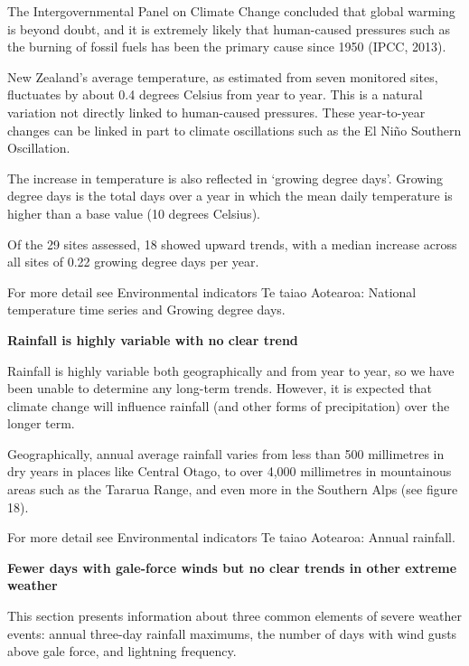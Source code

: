 \documentclass[11pt]{article} %
\begin{document}
The Intergovernmental Panel on Climate Change concluded that global warming is beyond doubt, and it is extremely likely that human-caused pressures such as the burning of fossil fuels has been the primary cause since 1950 (IPCC, 2013).


New Zealand’s average temperature, as estimated from seven monitored sites, fluctuates by about 0.4 degrees Celsius from year to year. This is a natural variation not directly linked to human-caused pressures. These year-to-year changes can be linked in part to climate oscillations such as the El Niño Southern Oscillation.

The increase in temperature is also reflected in ‘growing degree days’. Growing degree days is the total days over a year in which the mean daily temperature is higher than a base value (10 degrees Celsius).

Of the 29 sites assessed, 18 showed upward trends, with a median increase across all sites of 0.22 growing degree days per year.

For more detail see Environmental indicators Te taiao Aotearoa: National temperature time series and Growing degree days.

\textbf{Rainfall is highly variable with no clear trend}

Rainfall is highly variable both geographically and from year to year, so we have been unable to determine any long-term trends. However, it is expected that climate change will influence rainfall (and other forms of precipitation) over the longer term.

Geographically, annual average rainfall varies from less than 500 millimetres in dry years in places like Central Otago, to over 4,000 millimetres in mountainous areas such as the Tararua Range, and even more in the Southern Alps (see figure 18).

For more detail see Environmental indicators Te taiao Aotearoa: Annual rainfall.


\textbf{Fewer days with gale-force winds but no clear trends in other extreme weather}

This section presents information about three common elements of severe weather events: annual three-day rainfall maximums, the number of days with wind gusts above gale force, and lightning frequency.
\end{document}
